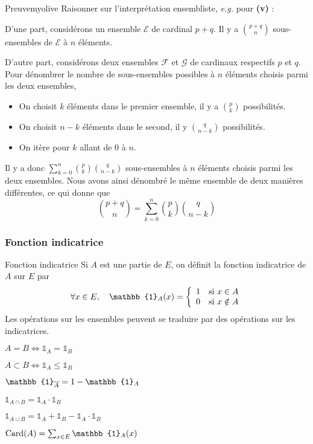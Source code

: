     \begin{demo}{Preuve}{myolive}
        Raisonner sur l’interprétation ensembliste, \textit{e.g.} pour \textbf{(v)} :

        D’une part, considérons un ensemble $\mathcal{E}$ de cardinal $p+q$. Il y a $\binom{p+q}{n}$ sous-ensembles de $\mathcal{E}$ à $n$ éléments. 

        D’autre part, considérons deux ensembles $\mathcal{F}$ et $\mathcal{G}$ de cardinaux respectifs $p$ et $q$. Pour dénombrer le nombre de sous-ensembles possibles à $n$ éléments choisis parmi les deux ensembles, 
        \begin{itemize}
            \item On choisit $k$ éléments dans le premier ensemble, il y a $\binom{p}{k}$ possibilités.
            \item On choisit $n-k$ éléments dans le second, il y $\binom{q}{n-k}$ possibilités.
            \item On itère pour $k$ allant de $0$ à $n$.
        \end{itemize}
        Il y a donc $\sum\limits_{k=0}^n \binom{p}{k} \binom{q}{n-k}$ sous-ensembles à $n$ éléments choisis parmi les deux ensembles. Nous avons ainsi dénombré le même ensemble de deux manières différentes, ce qui donne que 
        \[ \binom{p+q}{n} = \sum\limits_{k=0}^n \binom{p}{k} \binom{q}{n-k} \] 
    \end{demo}

    \subsubsection{Fonction indicatrice}

    \begin{defitheo}{Fonction indicatrice}{}
        Si $A$ est une partie de $E$, on définit la fonction indicatrice de $A$ sur $E$ par 
        \[ \forall x \in E, \quad \mathbb{1}_A(x) = \sisi{1}{x \in A}{0}{x \notin A} \]   
        Les opérations sur les ensembles peuvent se traduire par des opérations sur les indicatrices.
        \begin{enumerate}
            \begin{multicols}{2}
                \item $A = B \iff \mathbb{1}_A = \mathbb{1}_B$
                \item $A \subset B \iff \mathbb{1}_A \leq \mathbb{1}_B$ 
                \item $\mathbb{1}_{\barr{A}} = 1 - \mathbb{1}_A$
                \item $\mathbb{1}_{A \cap B} = \mathbb{1}_A \cdotp \mathbb{1}_B$
                \item $\mathbb{1}_{A \cup B} = \mathbb{1}_A + \mathbb{1}_B - \mathbb{1}_A \cdotp \mathbb{1}_B$
                \item $\card(A)= \sum_{x \in E} \mathbb{1}_A(x)$
            \end{multicols}
        \end{enumerate}
    \end{defitheo}

